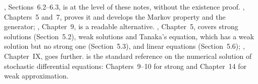 
\furtherreading
\textcite{shreve2}, Sections~6.2--6.3, is at the level of these notes, without the
existence proof. \textcite{oksendal}, Chapters~5 and~7, proves it and develops the Markov
property and the generator; \textcite{steele}, Chapter~9, is a readable alternative.
\textcite{karatzas-shreve}, Chapter~5, covers strong solutions (Section~5.2), weak
solutions and Tanaka's equation, which has a weak solution but no strong one (Section~5.3),
and linear equations (Section~5.6); \textcite{revuz-yor}, Chapter~IX, goes further. \textcite{kloeden-platen} is the standard reference
on the numerical solution of stochastic differential equations: Chapters~9--10 for strong
and Chapter~14 for weak approximation.
